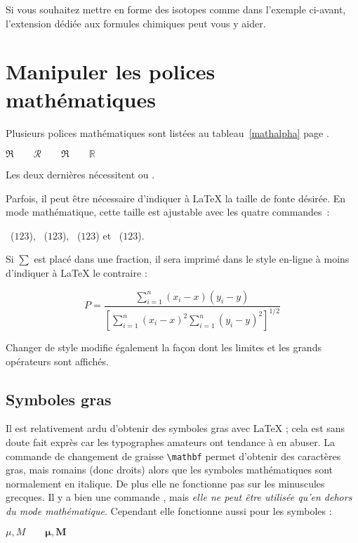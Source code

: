 Si vous souhaitez mettre en forme des isotopes comme dans l'exemple
ci-avant, l'extension  dédiée aux formules chimiques peut
vous y aider.


\section{Manipuler les polices mathématiques}\label{sec:fontsz}
Plusieurs polices mathématiques sont listées au tableau~\ref{mathalpha}
page \pageref{mathalpha}.
\begin{example}
 $\Re \qquad
  \mathcal{R} \qquad
  \mathfrak{R} \qquad
  \mathbb{R} \qquad $  
\end{example}
Les deux dernières nécessitent  ou .

Parfois, il peut être nécessaire d'indiquer à \LaTeX{} la taille
de fonte désirée. En mode mathématique, cette taille est ajustable
avec les quatre commandes~:
\begin{flushleft}
~($\displaystyle 123$),
 ~($\textstyle 123$), 
~($\scriptstyle 123$) et
~($\scriptscriptstyle 123$).
\end{flushleft}

Si $\sum$ est placé dans une fraction, il sera imprimé dans le style \og
en-ligne \fg à
moins d'indiquer à \LaTeX{} le contraire :
\begin{example}
\begin{equation*}
 P = \frac{\displaystyle{
   \sum_{i=1}^n (x_i-x)
   (y_i-y)}}
   {\displaystyle{\left[
   \sum_{i=1}^n(x_i-x)^2
   \sum_{i=1}^n(y_i-y)^2
   \right]^{1/2}}}
\end{equation*}
\end{example}

Changer de style modifie également la façon dont les limites et les
grands opérateurs sont affichés.
 


\subsection{Symboles gras}

Il est relativement ardu d'obtenir des symboles gras avec \LaTeX{} ;
cela est sans doute fait exprès car les typographes amateurs ont
tendance à en abuser. La commande de changement de graisse
\verb|\mathbf| permet d'obtenir des caractères gras, mais romains
(donc droits) alors que les symboles mathématiques sont normalement en
italique. De plus elle ne fonctionne pas sur les minuscules
grecques. Il y a bien une commande , mais \emph{elle ne
  peut être utilisée qu'en dehors du mode mathématique}. Cependant
elle fonctionne aussi pour les symboles :
\begin{example}
$\mu, M \qquad 
\mathbf{\mu}, \mathbf{M}$
\qquad {}
\end{example}

